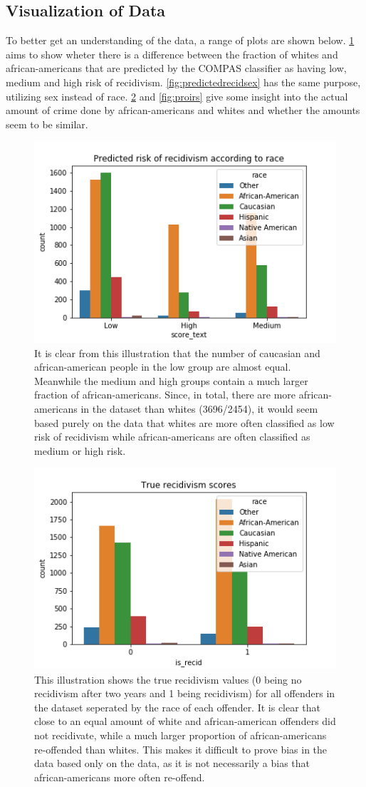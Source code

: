 \documentclass[11pt, fleqn, titlepage]{article}
\begin{document}
		
	\subsection{Visualization of Data}
	To better get an understanding of the data, a range of plots are shown below. \ref{fig:predictedrecidrace} aims to show wheter there is a difference between the fraction of whites and african-americans that are predicted by the COMPAS classifier as having low, medium and high risk of recidivism. \ref{fig:predictedrecidsex} has the same purpose, utilizing sex instead of race. \ref{fig:truerecid} and \ref{fig:proirs} give some insight into the actual amount of crime done by african-americans and whites and whether the amounts seem to be similar.
	
	\begin{figure}[H]
		\centering
		\includegraphics[width=0.5\linewidth]{imgs/predicted_recid_race}
		\caption{It is clear from this illustration that the number of caucasian and african-american people in the low group are almost equal. Meanwhile the medium and high groups contain a much larger fraction of african-americans. Since, in total, there are more african-americans in the dataset than whites (3696/2454), it would seem based purely on the data that whites are more often classified as low risk of recidivism while african-americans are often classified as medium or high risk.}
		\label{fig:predictedrecidrace}
	\end{figure}
	
	\begin{figure}[H]
		\centering
		\includegraphics[width=0.5\linewidth]{imgs/true_recid}
		\caption{This illustration shows the true recidivism values (0 being no recidivism after two years and 1 being recidivism) for all offenders in the dataset seperated by the race of each offender. It is clear that close to an equal amount of white and african-american offenders did not recidivate, while a much larger proportion of african-americans re-offended than whites. This makes it difficult to prove bias in the data based only on the data, as it is not necessarily a bias that african-americans more often re-offend.}
		\label{fig:truerecid}
	\end{figure}
	
\end{document}
